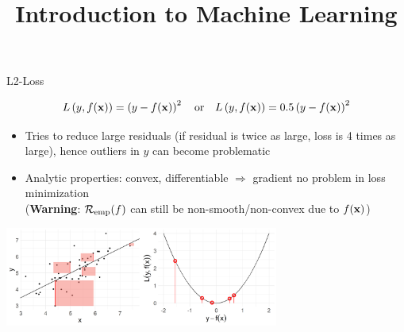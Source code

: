 \documentclass[11pt,compress,t,notes=noshow, xcolor=table]{beamer}
\title{Introduction to Machine Learning}
\begin{document}
    

\begin{vbframe}{L2-Loss}

\vspace*{-0.5cm}

$$
L\left(y, f(\mathbf{x})\right) = \left(y-f(\mathbf{x})\right)^2 \quad \text{or} \quad L\left(y, f(\mathbf{x})\right) = 0.5 \left(y-f(\mathbf{x})\right)^2
$$

\vspace*{-2mm}

\begin{itemize}
\item Tries to reduce large residuals (if residual is twice as large, loss is 4 times as large), hence outliers in $y$ can become problematic
\item Analytic properties: convex, differentiable $\Rightarrow$ gradient no problem in loss minimization\\ {\small (\textbf{Warning}: $\mathcal{R}_{\text{emp}}(f)$ can still be non-smooth/non-convex due to $f(\mathbf{x})$)}
\end{itemize}






\begin{center}
  \includegraphics[width = 9cm]{figure/loss_quadratic_2.png} \\
\end{center}

\end{vbframe}
\end{document}
